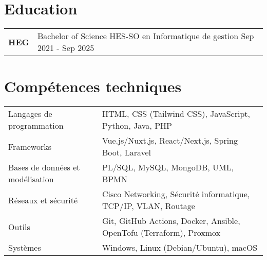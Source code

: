 \documentclass[a4paper,11pt]{article}
\begin{document}
\section{Education}
\begin{tabularx}{\linewidth}{@{}l X@{}}	
\textbf{HEG} & Bachelor of Science HES-SO en Informatique de gestion \hfill \normalsize Sep 2021 - Sep 2025\\

\end{tabularx}


\section{Compétences techniques}
\begin{tabularx}{\linewidth}{@{}l X@{}}
Langages de programmation & HTML, CSS (Tailwind CSS), JavaScript, Python, Java, PHP \\
Frameworks & Vue.js/Nuxt.js, React/Next.js, Spring Boot, Laravel \\
Bases de données et modélisation & PL/SQL, MySQL, MongoDB, UML, BPMN \\
Réseaux et sécurité & Cisco Networking, Sécurité informatique, TCP/IP, VLAN, Routage \\
Outils & Git, GitHub Actions, Docker, Ansible, OpenTofu (Terraform), Proxmox \\
Systèmes & Windows, Linux (Debian/Ubuntu), macOS \\
\end{tabularx}
\end{document}
